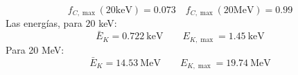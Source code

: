 \begin{equation*}
   f_{C,\max}(20\text{keV}) = 0.073    \quad 
    f_{C,\max}(20\text{MeV}) = 0.99
\end{equation*}
Las energías, para $20$ keV:
\begin{equation*}
    \bar{E}_K = 0.722 \ \text{keV} \qquad  E_{K,\max}= 1.45 \ \text{keV}
\end{equation*}
Para 20 MeV: 
\begin{equation*}
    \bar{E}_K = 14.53 \  \text{MeV} \qquad  E_{K,\max}= 19.74 \ \text{MeV}
\end{equation*}


